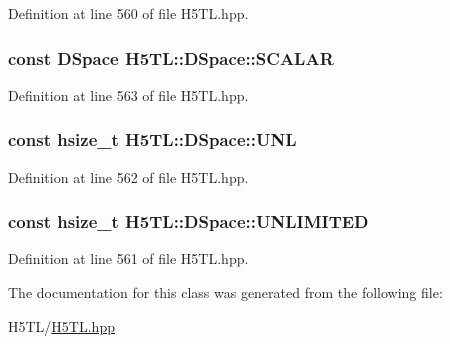 Definition at line 560 of file H5\-T\-L.\-hpp.

\hypertarget{class_h5_t_l_1_1_d_space_a0fd9cf77c7cd46e51764f71ce1e6eb11}{
\subsubsection[{S\-C\-A\-L\-A\-R}]{\setlength{\rightskip}{0pt plus 5cm}const {\bf D\-Space} H5\-T\-L\-::\-D\-Space\-::\-S\-C\-A\-L\-A\-R\hspace{0.3cm}{\ttfamily [static]}}}\label{class_h5_t_l_1_1_d_space_a0fd9cf77c7cd46e51764f71ce1e6eb11}


Definition at line 563 of file H5\-T\-L.\-hpp.

\hypertarget{class_h5_t_l_1_1_d_space_a3f52ebf53e3a4da32927b0867a0bd8f9}{
\subsubsection[{U\-N\-L}]{\setlength{\rightskip}{0pt plus 5cm}const hsize\-\_\-t H5\-T\-L\-::\-D\-Space\-::\-U\-N\-L\hspace{0.3cm}{\ttfamily [static]}}}\label{class_h5_t_l_1_1_d_space_a3f52ebf53e3a4da32927b0867a0bd8f9}


Definition at line 562 of file H5\-T\-L.\-hpp.

\hypertarget{class_h5_t_l_1_1_d_space_a2c7e4e6d7392338ff352da82243f9f21}{
\subsubsection[{U\-N\-L\-I\-M\-I\-T\-E\-D}]{\setlength{\rightskip}{0pt plus 5cm}const hsize\-\_\-t H5\-T\-L\-::\-D\-Space\-::\-U\-N\-L\-I\-M\-I\-T\-E\-D\hspace{0.3cm}{\ttfamily [static]}}}\label{class_h5_t_l_1_1_d_space_a2c7e4e6d7392338ff352da82243f9f21}


Definition at line 561 of file H5\-T\-L.\-hpp.



The documentation for this class was generated from the following file\-:\begin{DoxyCompactItemize}
\item 
H5\-T\-L/\hyperlink{_h5_t_l_8hpp}{H5\-T\-L.\-hpp}\end{DoxyCompactItemize}
